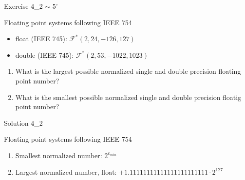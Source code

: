 \ifnum\conditionmacro=1 \documentclass[handout,usenames,dvipsnames]{beamer}\fi
\begin{document}

\begin{frame}{Exercise 4\_2 $\sim$ 5'}
\begin{block}{Floating point systems following IEEE 754}
\begin{itemize}
\item float (IEEE 745): $\mathcal{F}^\ast(2,24,-126,127)$
\item double (IEEE 745): $\mathcal{F}^\ast(2,53,-1022,1023)$
\end{itemize}
\begin{enumerate}
\item What is the largest possible normalized single and double precision floating point number?
\item What is the smallest possible normalized single and double precision floatig point number?
\end{enumerate}
\end{block}
\end{frame}

\begin{frame}{Solution 4\_2}
\begin{block}{Floating point systems following IEEE 754}
\begin{enumerate}
\item Smallest normalized number: $2^{e_{min}}$
\item Largest normalized number, float: $+1.11111111111111111111111\cdot2^{127}$
\end{enumerate}
\end{block}
\end{frame}
\end{document}
